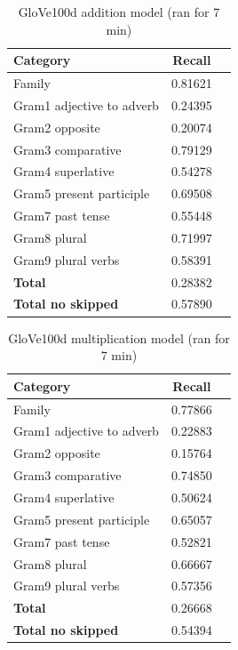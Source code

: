 \begin{table}[h!]
	\centering
\begin{tabular}{| l | c | r}
    	\hline
    	\textbf{Category} &    \textbf{Recall}\\ \hline
    	Family 						& 0.81621 \\
    	Gram1 adjective to adverb 	& 0.24395 \\
    	Gram2 opposite 				& 0.20074 \\
    	Gram3 comparative 			& 0.79129 \\
    	Gram4 superlative 			& 0.54278 \\
    	Gram5 present participle	& 0.69508 \\
    	Gram7 past tense 			& 0.55448 \\
    	Gram8 plural 				& 0.71997 \\
    	Gram9 plural verbs 			& 0.58391 \\
    	\textbf{Total}				& 0.28382 \\
    	\textbf{Total no skipped}	& 0.57890 \\ \hline
\end{tabular}
\caption{GloVe100d addition model (ran for 7 min)}
\label{table:glove100d_addition}
\end{table}

\begin{table}[h!]
	\centering
\begin{tabular}{| l | c | r}
    	\hline
    	\textbf{Category} &    \textbf{Recall}\\ \hline
    	Family 						& 0.77866 \\
    	Gram1 adjective to adverb 	& 0.22883 \\
    	Gram2 opposite 				& 0.15764 \\
    	Gram3 comparative 			& 0.74850 \\
    	Gram4 superlative 			& 0.50624 \\
    	Gram5 present participle	& 0.65057 \\
    	Gram7 past tense 			& 0.52821 \\
    	Gram8 plural 				& 0.66667 \\
    	Gram9 plural verbs 			& 0.57356 \\
    	\textbf{Total}				& 0.26668 \\
    	\textbf{Total no skipped}	& 0.54394 \\ \hline
\end{tabular}
\caption{GloVe100d multiplication model (ran for 7 min)}
\label{table:glove100d_addition}
\end{table}



